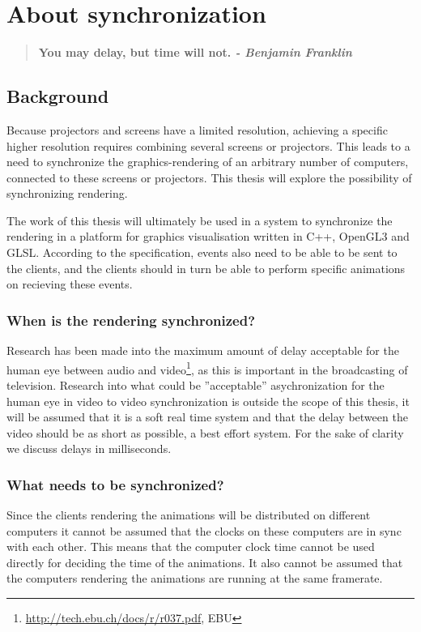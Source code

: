 \chapter{About synchronization}

\begin{quotation}
\bf You may delay, but time will not.
\rm \center \em - Benjamin Franklin
\end{quotation}

\section{Background}

Because projectors and screens have a limited resolution, achieving a specific higher resolution requires combining several screens or projectors. This leads to a need to synchronize the graphics-rendering of an arbitrary number of computers, connected to these screens or projectors. This thesis will explore the possibility of synchronizing rendering.

The work of this thesis will ultimately be used in a system to synchronize the rendering in a platform for graphics visualisation written in C++, OpenGL3 and GLSL. According to the specification, events also need to be able to be sent to the clients, and the clients should in turn be able to perform specific animations on recieving these events.  

\subsection{When is the rendering synchronized?}

Research has been made into the maximum amount of delay acceptable for the human eye between audio and video\footnote{\url{http://tech.ebu.ch/docs/r/r037.pdf}, EBU}, as this is important in the broadcasting of television. Research into what could be ''acceptable'' asychronization for the human eye in video to video synchronization is outside the scope of this thesis, it will be assumed that it is a soft real time system and that the delay between the video should be as short as possible, a best effort system. For the sake of clarity we discuss delays in milliseconds.

\subsection{What needs to be synchronized?}

Since the clients rendering the animations will be distributed on different computers it cannot be assumed that the clocks on these computers are in sync with each other. This means that the computer clock time cannot be used directly for deciding the time of the animations. It also cannot be assumed that the computers rendering the animations are running at the same framerate. 

